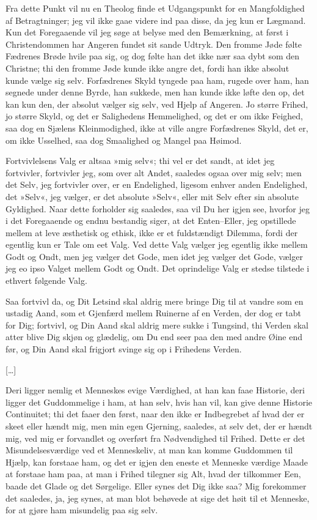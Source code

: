 \documentclass[12pt,a4paper]{article}
\begin{document}
Fra dette Punkt vil nu en Theolog finde et Udgangspunkt for en Mangfoldighed af Betragtninger; jeg vil ikke gaae videre ind paa disse, da jeg kun er Lægmand. Kun det Foregaaende vil jeg søge at belyse med den Bemærkning, at først i Christendommen har Angeren fundet sit sande Udtryk. Den fromme Jøde følte Fædrenes Brøde hvile paa sig, og dog følte han det ikke nær saa dybt som den Christne; thi den fromme Jøde kunde ikke angre det, fordi han ikke absolut kunde vælge sig selv. Forfædrenes Skyld tyngede paa ham, rugede over ham, han segnede under denne Byrde, han sukkede, men han kunde ikke løfte den op, det kan kun den, der absolut vælger sig selv, ved Hjelp af Angeren. Jo større Frihed, jo større Skyld, og det er Salighedens Hemmelighed, og det er om ikke Feighed, saa dog en Sjælens Kleinmodighed, ikke at ville angre Forfædrenes Skyld, det er, om ikke Usselhed, saa dog Smaalighed og Mangel paa Høimod.

Fortvivlelsens Valg er altsaa »mig selv«; thi vel er det sandt, at idet jeg fortvivler, fortvivler jeg, som over alt Andet, saaledes ogsaa over mig selv; men det Selv, jeg fortvivler over, er en Endelighed, ligesom enhver anden Endelighed, det »Selv«, jeg vælger, er det absolute »Selv«, eller mit Selv efter sin absolute Gyldighed. Naar dette forholder sig saaledes, saa vil Du her igjen see, hvorfor jeg i det Foregaaende og endnu bestandig siger, at det Enten–Eller, jeg opstillede mellem at leve æsthetisk og ethisk, ikke er et fuldstændigt Dilemma, fordi der egentlig kun er Tale om eet Valg. Ved dette Valg vælger jeg egentlig ikke mellem Godt og Ondt, men jeg vælger det Gode, men idet jeg vælger det Gode, vælger jeg eo ipso Valget mellem Godt og Ondt. Det oprindelige Valg er stedse tilstede i ethvert følgende Valg.

Saa fortvivl da, og Dit Letsind skal aldrig mere bringe Dig til at vandre som en ustadig Aand, som et Gjenfærd mellem Ruinerne af en Verden, der dog er tabt for Dig; fortvivl, og Din Aand skal aldrig mere sukke i Tungsind, thi Verden skal atter blive Dig skjøn og glædelig, om Du end seer paa den med andre Øine end før, og Din Aand skal frigjort svinge sig op i Frihedens Verden.

[…]

Deri ligger nemlig et Menneskes evige Værdighed, at han kan faae Historie, deri ligger det Guddommelige i ham, at han selv, hvis han vil, kan give denne Historie Continuitet; thi det faaer den først, naar den ikke er Indbegrebet af hvad der er skeet eller hændt mig, men min egen Gjerning, saaledes, at selv det, der er hændt mig, ved mig er forvandlet og overført fra Nødvendighed til Frihed. Dette er det Misundelsesværdige ved et Menneskeliv, at man kan komme Guddommen til Hjælp, kan forstaae ham, og det er igjen den eneste et Menneske værdige Maade at forstaae ham paa, at man i Frihed tilegner sig Alt, hvad der tilkommer Een, baade det Glade og det Sørgelige. Eller synes det Dig ikke saa? Mig forekommer det saaledes, ja, jeg synes, at man blot behøvede at sige det høit til et Menneske, for at gjøre ham misundelig paa sig selv.
\end{document}
